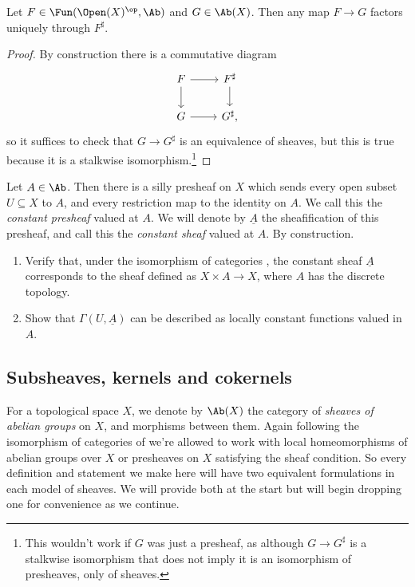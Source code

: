 \documentclass[11pt]{book}
\begin{document}
\begin{proposition}\label{prop:UP-of-sheafification}
Let $F\in \Fun(\Open(X)^\op,\Ab)$ and $G\in \Ab(X)$. Then any map $F \to G$ factors uniquely through $F^\sharp$.
\end{proposition}
\begin{proof} By construction there is a commutative diagram
\[ \begin{tikzcd}
    F\rar\dar & F^\sharp\dar\\
    G\rar & G^\sharp,
\end{tikzcd} \]
so it suffices to check that $G\to G^\sharp$ is an equivalence of sheaves, but this is true because it is a stalkwise isomorphism.\footnote{This wouldn't work if $G$ was just a presheaf, as although $G\to G^\sharp$ is a stalkwise isomorphism that does not imply it is an isomorphism of presheaves, only of sheaves.}
\end{proof}

\begin{exercise}
\label{exer:constant-sheaf}
Let $A\in \Ab$. Then there is a silly presheaf on $X$ which sends every open subset $U\subseteq X$ to $A$, and every restriction map to the identity on $A$. We call this the \emph{constant presheaf} valued at $A$. We will denote by $\underline{A}$ the sheafification of this presheaf, and call this the \emph{constant sheaf} valued at $A$. By construction.
\begin{enumerate}
    \item Verify that, under the isomorphism of categories , the constant sheaf $\underline{A}$ corresponds to the sheaf  defined as $X \times A \to X$, where $A$ has the discrete topology.
    \item Show that $\Gamma(U,\underline{A})$ can be described as locally constant functions valued in $A$.
\end{enumerate}
\end{exercise}


\subsection{Subsheaves, kernels and cokernels}

\begin{notation} For a topological space $X$, we denote by $\Ab(X)$ the category of \emph{sheaves of abelian groups} on $X$, and morphisms between them. Again following the isomorphism of categories of  we're allowed to work with local homeomorphisms of abelian groups over $X$ or presheaves on $X$ satisfying the sheaf condition. So every definition and statement we make here will have two equivalent formulations in each model of sheaves. We will provide both at the start but will begin dropping one for convenience as we continue.
\end{notation}
\end{document}
